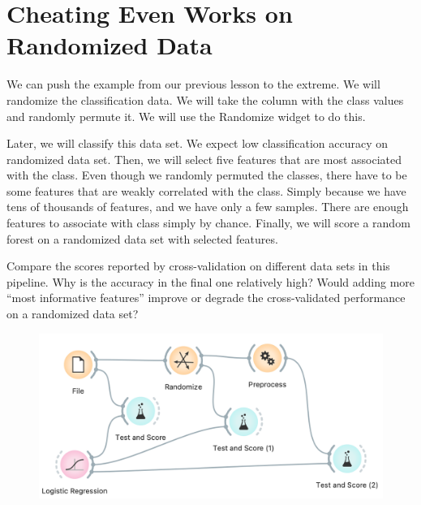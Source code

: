 \chapter{Cheating Even Works on \\ Randomized Data}
\label{ch:fss-randomized}

We can push the example from our previous lesson to the extreme. We will randomize the classification data. We will take the column with the class values and randomly permute it. We will use the Randomize widget to do this.

Later, we will classify this data set. We expect low classification accuracy on randomized data set. Then, we will select five features that are most associated with the class. Even though we randomly permuted the classes, there have to be some features that are weakly correlated with the class. Simply because we have tens of thousands of features, and we have only a few samples. There are enough features to associate with class simply by chance. Finally, we will score a random forest on a randomized data set with selected features.

Compare the scores reported by cross-validation on different data sets in this pipeline. Why is the accuracy in the final one relatively high? Would adding more “most informative features” improve or degrade the cross-validated performance on a randomized data set?

%
\begin{figure}[h]
    \centering
    \includegraphics[scale=0.5]{randomize-fss.png}
    \caption{$\;$}
\end{figure}
